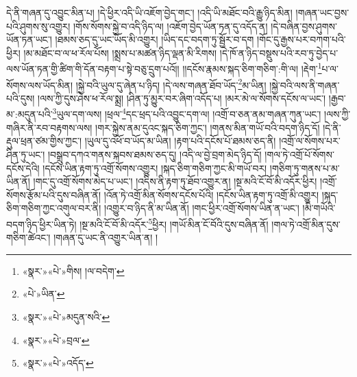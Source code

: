 དེ་ནི་གཞན་དུ་འབྱུང་མིན་པ། །དེ་ཕྱིར་འདི་ཡི་འཇོག་བྱེད་གང་། །འདི་ཡི་མཐོང་བའི་རྒྱུ་ཉིད་མིན། །གཞན་ཡང་བྱས་པའི་ཤུགས་སུ་འགྱུར། །གོས་སོགས་སྐྱེ་བ་འདི་ཉིད་ལ། །འཇོག་བྱེད་ཡོན་ཏན་དུ་འདོད་ན། །དེ་བཞིན་བྱས་ཤུགས་ཡོན་ཏན་ཡང་། །ཐམས་ཅད་དུ་ཡང་ཡོད་མི་འགྱུར། །ཡིད་དང་བདག་ཏུ་སྦྱོར་བ་དག །གོང་དུ་རྒྱས་པར་བཀག་པའི་ཕྱིར། །མ་མཐོང་བ་ལ་ཕ་རོལ་པོས། །སྨྲས་པ་མཚན་ཉིད་ལྡན་མི་རིགས། །དེ་ཁོ་ན་ཉིད་བསྡུས་པའི་རབ་ཏུ་བྱེད་པ་ལས་ཡོན་ཏན་གྱི་ཚིག་གི་དོན་བརྟག་པ་སྟེ་བཅུ་དྲུག་པའོ།། །།དངོས་རྣམས་སྐད་ཅིག་གཅིག་:གི་ལ། །རྡེག་\footnote{«སྣར་»«པེ་»གིས། །ལ་བདེག་}པ་ལ་སོགས་ལས་ཡོད་མིན། །སྐྱེ་བའི་ཡུལ་དུ་ཞེན་པ་ཉིད། །དེ་ལས་གཞན་ཐོབ་ཡོད་\footnote{«པེ་»ཡིན་}མ་ཡིན། །སྐྱེ་བའི་ལས་ནི་གཞན་པའི་དུས། །ལས་ཀྱི་དུས་ཤེས་ཕ་རོལ་སྨྲ། །ཤིན་ཏུ་མྱུར་བར་ཞིག་འདོད་པ། །མར་མེ་ལ་སོགས་དངོས་ལ་ཡང་། །རྒྱབ་མ་:མདུན་པའི་\footnote{«སྣར་»«པེ་»མདུན་སའི་}ཡུལ་དག་ལས། །ཕྲལ་\footnote{«སྣར་»«པེ་»བྲལ་}དང་ཕྲད་པའི་འབྱུང་དག་ལ། །འགྲོ་བ་ཅན་ནམ་གཞན་ཀུན་ཡང་། །ལས་ཀྱི་གཞིར་ནི་རབ་བརྟགས་ལས། །གར་སྐྱེས་ནམ་དུའང་སྐད་ཅིག་ཀྱང་། །གནས་མིན་གཡོ་བའི་བདག་ཉིད་དོ། །དེ་ནི་རྡུལ་ཕྲན་ཙམ་གྱིས་ཀྱང་། །ཡུལ་དུ་འཕོ་བ་ཡོད་མ་ཡིན། །རྟག་པའི་དངོས་པོ་ཐམས་ཅད་ནི། །འགྲོ་ལ་སོགས་པར་ཤིན་ཏུ་ཡང་། །བསྒྲུབ་དཀའ་གནས་སྐབས་ཐམས་ཅད་དུ། །འདི་ལ་བྱེ་བྲག་མེད་ཉིད་དོ། །གལ་ཏེ་འགྲོ་པོ་སོགས་དངོས་དེའི། །དངོས་ཡིན་རྟག་ཏུ་འགྲོ་སོགས་འགྱུར། །སྐད་ཅིག་གཅིག་ཀྱང་མི་གཡོ་བར། །གཅིག་ཏུ་གནས་པ་མ་ཡིན་ནོ། །གང་དུ་འགྲོ་སོགས་མེད་པ་ཡང་། །འདིས་ནི་རྟག་ཏུ་ཐོབ་འགྱུར་ན། །སྔ་མའི་ངོ་བོ་མི་འདོར་ཕྱིར། །འགྲོ་སོགས་རྩོམ་པའི་དུས་བཞིན་ནོ། །འོན་ཏེ་འགྲོ་མིན་སོགས་དངོས་པོའི། །དངོས་ཡིན་རྟག་ཏུ་འགྲོ་མི་འགྱུར། །སྐད་ཅིག་གཅིག་ཀྱང་འགུལ་བར་ནི། །འགྱུར་བ་ཉིད་ནི་མ་ཡིན་ནོ། །གང་ཕྱིར་འགྲོ་སོགས་ཡིན་ན་ཡང་། །མི་གཡོའི་བདག་ཉིད་ཕྱིར་ཡིན་ཏེ། །སྔ་མའི་ངོ་བོ་མི་འདོར་\footnote{«སྣར་»«པེ་»འདོད་}ཕྱིར། །གཡོ་མིན་ངོ་བོའི་དུས་བཞིན་ནོ། །གལ་ཏེ་འགྲོ་མིན་དུས་གཅིག་ཚེའང་། །གཞན་དུ་ཡང་ནི་འགྱུར་ཡིན་ན། །
